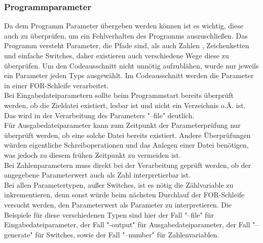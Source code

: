 \documentclass[11pt]{article}
\begin{document}
  \subsubsection{Programmparameter}
  Da dem Programm Parameter übergeben werden können ist es wichtig, diese auch zu überprüfen, um ein Fehlverhalten des Programms auszuschließen. Das Programm versteht Parameter, die Pfade sind, als auch Zahlen
  , Zeichenketten und einfache Switches, daher existieren auch verschiedene Wege diese zu überprüfen.
  Um den Codeausschnitt nicht unnötig aufzublähen, wurde nur jeweils ein Parameter jeden Typs ausgewählt.
  Im Codeausschnitt werden die Parameter in einer FOR-Schleife verarbeitet.\\
  Bei Eingabedateiparametern sollte beim Programmstart bereits überprüft werden, ob die Zieldatei existiert, lesbar ist und nicht ein Verzeichnis o.Ä. ist. Das wird in der Verarbeitung des Parameters "\---file" deutlich.\\
 Für Ausgabedateiparameter kann zum Zeitpunkt der Parameterprüfung nur überprüft werden, ob eine solche Datei bereits existiert. Andere Überprüfungen würden eigentliche Schreiboperationen und das Anlegen einer Datei benötigen, was jedoch zu diesem frühen Zeitpunkt zu vermeiden ist.\\
Bei Zahlenparametern muss direkt bei der Verarbeitung geprüft werden, ob der angegebene Parameterwert auch als Zahl interpretierbar ist.\\
Bei allen Parametertypen, außer Switches, ist es nötig die Zählvariable zu inkrementieren, denn sonst würde beim nächsten Durchlauf der FOR-Schleife versucht werden, den Parameterwert als Parameter zu interpretieren.
Die Beispiele für diese verschiedenen Typen sind hier der Fall "\---file" für Eingabedateiparameter, der Fall "\--output" für Ausgabedateiparameter, der Fall "\---generate" für Switches, sowie der Fall "\---number" für Zahlenvariablen.
\end{document}
